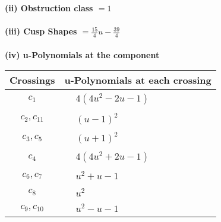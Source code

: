 \documentclass[1p]{elsarticle_modified}
\theoremstyle{definition}
\begin{document}
\flushleft \textbf{(ii) Obstruction class $= 1$}\\~\\
\flushleft \textbf{(iii) Cusp Shapes $= \frac{15}{4} u-\frac{39}{4}$}\\~\\
\newpage\renewcommand{\arraystretch}{1}
\flushleft \textbf{(iv) u-Polynomials at the component}\newline \\
\begin{tabular}{m{50pt}|m{274pt}}
Crossings & \hspace{64pt}u-Polynomials at each crossing \\
\hline $$\begin{aligned}c_{1}\end{aligned}$$&$\begin{aligned}
&4(4 u^2-2 u-1)
\end{aligned}$\\
\hline $$\begin{aligned}c_{2},c_{11}\end{aligned}$$&$\begin{aligned}
&(u-1)^2
\end{aligned}$\\
\hline $$\begin{aligned}c_{3},c_{5}\end{aligned}$$&$\begin{aligned}
&(u+1)^2
\end{aligned}$\\
\hline $$\begin{aligned}c_{4}\end{aligned}$$&$\begin{aligned}
&4(4 u^2+2 u-1)
\end{aligned}$\\
\hline $$\begin{aligned}c_{6},c_{7}\end{aligned}$$&$\begin{aligned}
&u^2+u-1
\end{aligned}$\\
\hline $$\begin{aligned}c_{8}\end{aligned}$$&$\begin{aligned}
&u^2
\end{aligned}$\\
\hline $$\begin{aligned}c_{9},c_{10}\end{aligned}$$&$\begin{aligned}
&u^2- u-1
\end{aligned}$\\
\hline
\end{tabular}\\~\\
\end{document}
